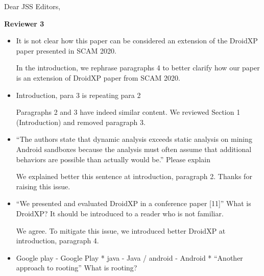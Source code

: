 \documentclass[12pt,english]{scrartcl}
\begin{document}
\begin{letter}{Dear JSS Editors,}
\begin{itemize}
\end{itemize}

{\bf Reviewer 3}

\begin{itemize}

\item It is not clear how this paper can be considered an extension of the DroidXP paper presented in SCAM 2020.


\vspace{0.2cm}

{\color{blue}{\bf Answer.} In the introduction, we rephrase paragraphs 4 to better clarify how our paper is an extension of DroidXP paper from SCAM 2020.}

\vspace{0.2cm}

\item Introduction, para 3 is repeating para 2


\vspace{0.2cm}

{\color{blue}{\bf Answer.} Paragraphs 2 and 3 have indeed similar content. We reviewed Section 1 (Introduction) and removed paragraph 3.}

\vspace{0.2cm}

\item ``The authors state that dynamic analysis exceeds static analysis on mining Android sandboxes because the
analysis must often assume that additional behaviors are possible than actually would be.''
Please explain


\vspace{0.2cm}

{\color{blue}{\bf Answer.} We explained better this sentence at introduction, paragraph 2. Thanks for raising this issue.}

\vspace{0.2cm}

\item ``We presented and evaluated DroidXP in a conference paper [11]''
What is DroidXP? It should be introduced to a reader who is not familiar.


\vspace{0.2cm}

{\color{blue}{\bf Answer.} We agree. To mitigate this issue, we introduced better DroidXP at introduction, paragraph 4.}

\vspace{0.2cm}

\item Google play - Google Play
* java - Java / android - Android
* ``Another approach to rooting''
What is rooting?



\end{itemize}
\end{letter}
\end{document}
